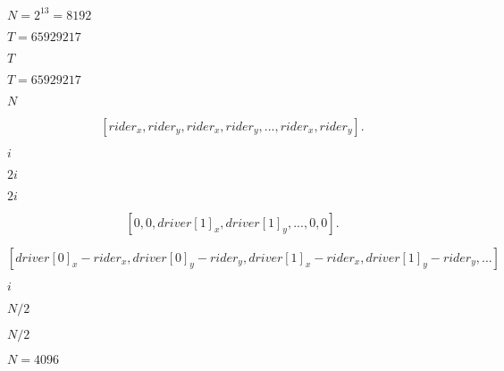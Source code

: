 \documentclass[10pt]{book}
\begin{document}
\begin{mdSnippets}
\begin{mdInlineSnippet}[0ab9c4827db63e3c061c71e969819aaf]%
$N=2^{13}=8192$\end{mdInlineSnippet}%
\begin{mdInlineSnippet}%
$T=65929217$\end{mdInlineSnippet}%
\begin{mdInlineSnippet}%
$T$\end{mdInlineSnippet}%
\begin{mdInlineSnippet}[644e513a1d2cee2d6fa9b5e91986ad3d]%
$T = 65929217$\end{mdInlineSnippet}%
\begin{mdInlineSnippet}[8d9c307cb7f3c4a32822a51922d1ceaa]%
$N$\end{mdInlineSnippet}%
\begin{mdDisplaySnippet}[6de3c54c9b8c3d7b962aa4b9fedc8216]%
\[%
[rider_x, rider_y, rider_x, rider_y, ... ,rider_x, rider_y].
\]%
\end{mdDisplaySnippet}%
\begin{mdInlineSnippet}[865c0c0b4ab0e063e5caa3387c1a8741]%
$i$\end{mdInlineSnippet}%
\begin{mdInlineSnippet}[e5de2e95102b1ed31c3edbcd9701b6f0]%
$2i$\end{mdInlineSnippet}%
\begin{mdInlineSnippet}[e5de2e95102b1ed31c3edbcd9701b6f0]%
$2i$\end{mdInlineSnippet}%
\begin{mdDisplaySnippet}%
\[%
[0, 0, driver[1]_x, driver[1]_y, ... , 0, 0].
\]%
\end{mdDisplaySnippet}%
\begin{mdDisplaySnippet}[ba5cc98bda132cc94141e37c4760b943]%
\[%
[driver[0]_x - rider_x, driver[0]_y - rider_y, driver[1]_x - rider_x, driver[1]_y - rider_y, ... ]
\]%
\end{mdDisplaySnippet}%
\begin{mdInlineSnippet}[865c0c0b4ab0e063e5caa3387c1a8741]%
$i$\end{mdInlineSnippet}%
\begin{mdInlineSnippet}[0e871a79d98cb1c7563b39b89aaf6153]%
$N/2$\end{mdInlineSnippet}%
\begin{mdInlineSnippet}[0e871a79d98cb1c7563b39b89aaf6153]%
$N/2$\end{mdInlineSnippet}%
\begin{mdInlineSnippet}[d2e1db8e21e3377fe23f20494e734620]%
$N=4096$\end{mdInlineSnippet}%

\end{mdSnippets}
\end{document}
